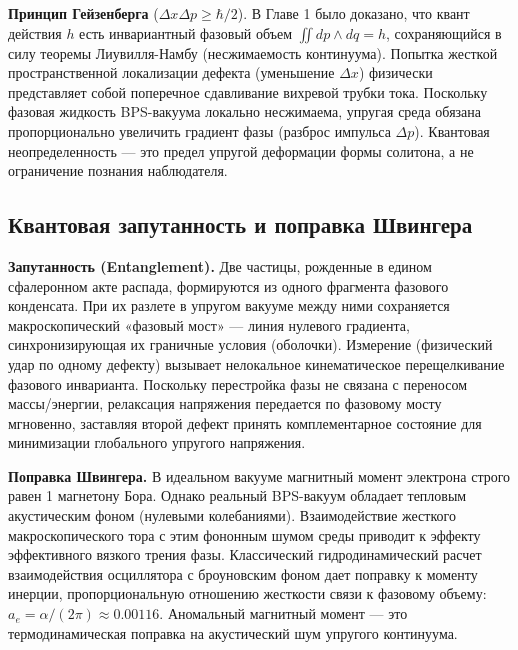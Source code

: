 \documentclass[12pt,a4paper]{article}
\begin{document}
\textbf{Принцип Гейзенберга} ($\Delta x \Delta p \ge \hbar/2$). В Главе 1 было доказано, что квант действия $h$ есть инвариантный фазовый объем $\iint dp \wedge dq = h$, сохраняющийся в силу теоремы Лиувилля-Намбу (несжимаемость континуума). Попытка жесткой пространственной локализации дефекта (уменьшение $\Delta x$) физически представляет собой поперечное сдавливание вихревой трубки тока. Поскольку фазовая жидкость BPS-вакуума локально несжимаема, упругая среда обязана пропорционально увеличить градиент фазы (разброс импульса $\Delta p$). Квантовая неопределенность — это предел упругой деформации формы солитона, а не ограничение познания наблюдателя.

\subsection{Квантовая запутанность и поправка Швингера}
\textbf{Запутанность (Entanglement).} Две частицы, рожденные в едином сфалеронном акте распада, формируются из одного фрагмента фазового конденсата. При их разлете в упругом вакууме между ними сохраняется макроскопический «фазовый мост» — линия нулевого градиента, синхронизирующая их граничные условия (оболочки). Измерение (физический удар по одному дефекту) вызывает нелокальное кинематическое перещелкивание фазового инварианта. Поскольку перестройка фазы не связана с переносом массы/энергии, релаксация напряжения передается по фазовому мосту мгновенно, заставляя второй дефект принять комплементарное состояние для минимизации глобального упругого напряжения.

\textbf{Поправка Швингера.} В идеальном вакууме магнитный момент электрона строго равен 1 магнетону Бора. Однако реальный BPS-вакуум обладает тепловым акустическим фоном (нулевыми колебаниями). Взаимодействие жесткого макроскопического тора с этим фононным шумом среды приводит к эффекту эффективного вязкого трения фазы. Классический гидродинамический расчет взаимодействия осциллятора с броуновским фоном дает поправку к моменту инерции, пропорциональную отношению жесткости связи к фазовому объему: $a_e = \alpha / (2\pi) \approx 0.00116$. Аномальный магнитный момент — это термодинамическая поправка на акустический шум упругого континуума.
\end{document}
